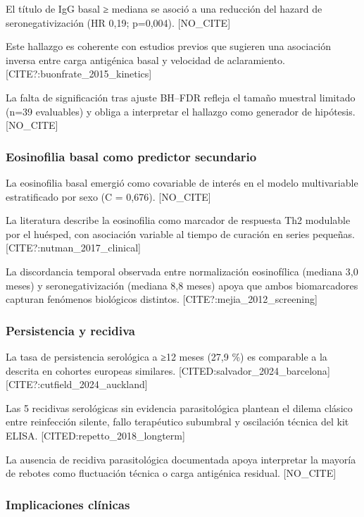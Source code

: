 \documentclass[
  spanish,
  12pt,
  a4paper,
]{article}
\begin{document}
El título de IgG basal ≥ mediana se asoció a una reducción del hazard de
seronegativización (HR 0,19; p=0,004). {[}NO\_CITE{]}

Este hallazgo es coherente con estudios previos que sugieren una
asociación inversa entre carga antigénica basal y velocidad de
aclaramiento. {[}CITE?:buonfrate\_2015\_kinetics{]}

La falta de significación tras ajuste BH--FDR refleja el tamaño muestral
limitado (n=39 evaluables) y obliga a interpretar el hallazgo como
generador de hipótesis. {[}NO\_CITE{]}

\subsubsection{Eosinofilia basal como predictor
secundario}\label{eosinofilia-basal-como-predictor-secundario}

La eosinofilia basal emergió como covariable de interés en el modelo
multivariable estratificado por sexo (C = 0,676). {[}NO\_CITE{]}

La literatura describe la eosinofilia como marcador de respuesta Th2
modulable por el huésped, con asociación variable al tiempo de curación
en series pequeñas. {[}CITE?:nutman\_2017\_clinical{]}

La discordancia temporal observada entre normalización eosinofílica
(mediana 3,0 meses) y seronegativización (mediana 8,8 meses) apoya que
ambos biomarcadores capturan fenómenos biológicos distintos.
{[}CITE?:mejia\_2012\_screening{]}

\subsubsection{Persistencia y recidiva}\label{persistencia-y-recidiva-1}

La tasa de persistencia serológica a ≥12 meses (27,9 \%) es comparable a
la descrita en cohortes europeas similares.
{[}CITED:salvador\_2024\_barcelona{]}
{[}CITE?:cutfield\_2024\_auckland{]}

Las 5 recidivas serológicas sin evidencia parasitológica plantean el
dilema clásico entre reinfección silente, fallo terapéutico subumbral y
oscilación técnica del kit ELISA. {[}CITED:repetto\_2018\_longterm{]}

La ausencia de recidiva parasitológica documentada apoya interpretar la
mayoría de rebotes como fluctuación técnica o carga antigénica residual.
{[}NO\_CITE{]}

\subsubsection{Implicaciones clínicas}\label{implicaciones-cluxednicas}
\end{document}
